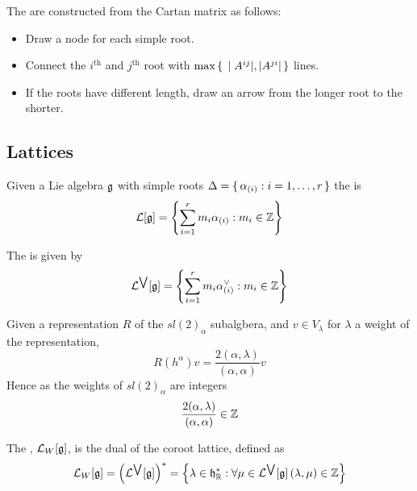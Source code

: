 \documentclass{article}
\begin{document}
\begin{definition}
	The  are constructed from the Cartan matrix as follows:
	\begin{itemize}
		\item Draw a node for each simple root.
		\item Connect the $i^{\text{th}}$ and $j^\text{th}$ root with $\max\set{  |A^{ij}|, |A^{ji}|  }$ lines. 
		\item If the roots have different length, draw an arrow from the longer root to the shorter. 
	\end{itemize}
\end{definition}

\subsection{Lattices}

\begin{definition}
	Given a Lie algebra $\mathfrak{g}$ with simple roots $\Delta=\set{  \alpha_{(i)} : i=1,\dots,r  }$ the  is 
	\[
	\mathcal{L} [\mathfrak{g}] = \left\{ \sum_{i=1}^r m_i \alpha_{(i)} : m_i \in\mathbb{Z} \right\}
	\]
\end{definition}

\begin{definition}
	The  is given by 
	\[
	\mathcal{L}^{\bigvee} [\mathfrak{g}] =\left\{ \sum_{i=1}^r m_i \alpha^\vee_{(i)} : m_i \in\mathbb{Z} \right\}
	\]
\end{definition}

\begin{definition}
	Given a representation $R$ of the $sl(2)_\alpha$ subalgbera, and $v\in V_\lambda$ for $\lambda$ a weight of the representation,
	\[
	R(h^\alpha)v=\frac{2(\alpha,\lambda)}{(\alpha,\alpha)}v
	\]
	Hence as the weights of $sl(2)_\alpha$ are integers
	\[
	\frac{2(\alpha,\lambda)}{(\alpha,\alpha)} \in \mathbb{Z}
	\]
\end{definition}

\begin{definition}
	The , $\mathcal{L}_W [\mathfrak{g}]$, is the dual of the coroot lattice, defined as 
	\[
	\mathcal{L}_W [\mathfrak{g}] = \left( \mathcal{L}^{\bigvee} [\mathfrak{g}] \right)^\ast = \left\{ \lambda\in\mathfrak{h}^\ast_{\mathbb{R}} : \forall \mu\in\mathcal{L}^{\bigvee} [\mathfrak{g}] \, (\lambda, \mu) \in \mathbb{Z} \right\}
	\]
\end{definition}
\end{document}

